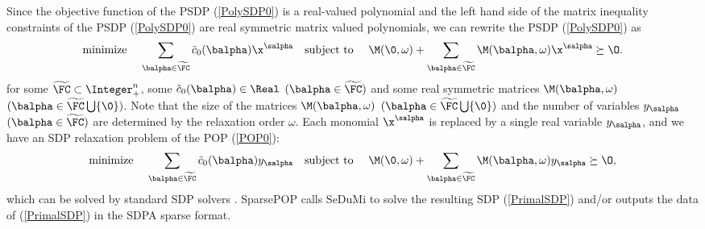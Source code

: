 Since the objective function of the PSDP (\ref{PolySDP0}) is a real-valued polynomial and 
the left hand side 
of the matrix inequality constraints of the PSDP (\ref{PolySDP0}) are 
real symmetric matrix valued polynomials, we can rewrite the PSDP (\ref{PolySDP0}) as
\[
\begin{array}{lllllll}
\mbox{minimize } & \displaystyle \sum_{\balpha \in \widetilde{\FC} }
\tilde{c}_0(\balpha) \x^{\salpha} &
\mbox{subject to } &  \displaystyle
\M(\0,\omega) + \sum_{\balpha \in \widetilde{\FC} } \M(\balpha,\omega) \x^{\salpha}
\succeq \O.
\end{array}
\]
for some $\widetilde{\FC} \subset \Integer^n_+$, some 
$\tilde{c}_0(\balpha) \in \Real$ $(\balpha \in \widetilde{\FC})$ and some 
real symmetric matrices 
$\M(\balpha,\omega)$ $(\balpha \in \widetilde{\FC} \bigcup \{ \0\})$. 
Note that the size of the matrices $\M(\balpha,\omega)$ $(\balpha \in \widetilde{\FC} \bigcup \{ \0\})$ 
and the number of variables $y_{\salpha}$ $(\balpha \in \widetilde{\FC})$ are determined by 
the relaxation order $\omega$. 
Each monomial $\x^{\salpha}$ is replaced by
a single real variable $y_{\salpha}$, and we have an SDP relaxation problem of the POP 
(\ref{POP0}):
\begin{equation}
\begin{array}{lllllll}
\mbox{minimize } & \displaystyle \sum_{\balpha \in \widetilde{\FC} }
\tilde{c}_0(\balpha) y_{\salpha} &
\mbox{subject to } &  \displaystyle
\M(\0,\omega) + \sum_{\balpha \in \widetilde{\FC} } \M(\balpha,\omega) y_{\salpha}
\succeq \O,
\end{array}
\label{PrimalSDP}
\end{equation}
which can be solved by standard SDP solvers \cite{STRUM99,SDPT3,YAMASHITA03}.
SparsePOP calls SeDuMi \cite{STRUM99} 
to solve the resulting SDP (\ref{PrimalSDP}) and/or outputs 
the data of (\ref{PrimalSDP}) in the SDPA sparse format. 

